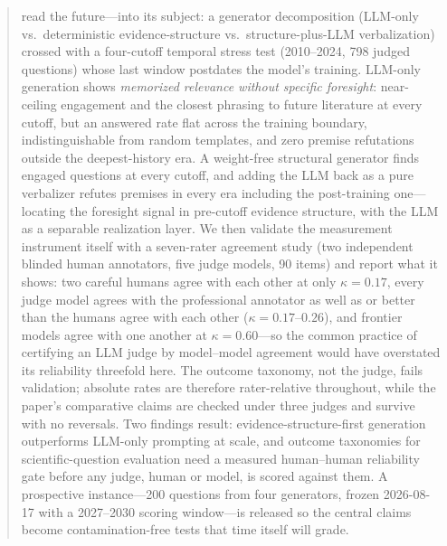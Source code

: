 \documentclass[11pt]{article}
\begin{document}
\begin{abstract}
read the future---into its subject: a generator decomposition (LLM-only
vs.\ deterministic evidence-structure vs.\ structure-plus-LLM
verbalization) crossed with a four-cutoff temporal stress test
(2010--2024, 798 judged questions) whose last window postdates the
model's training. LLM-only generation shows \emph{memorized relevance
without specific foresight}: near-ceiling engagement and the closest
phrasing to future literature at every cutoff, but an answered rate
flat across the training boundary, indistinguishable from random
templates, and zero premise refutations outside the deepest-history
era. A weight-free structural generator finds engaged questions at
every cutoff, and adding the LLM back as a pure verbalizer refutes
premises in every era including the post-training one---locating the
foresight signal in pre-cutoff evidence structure, with the LLM as a
separable realization layer. We then validate the measurement
instrument itself with a seven-rater agreement study (two independent
blinded human annotators, five judge models, 90 items) and report what
it shows: two careful humans agree with each other at only
$\kappa=0.17$, every judge model agrees with the professional annotator
as well as or better than the humans agree with each other
($\kappa=0.17$--$0.26$), and frontier models agree with one another at
$\kappa=0.60$---so the common practice of certifying an LLM judge by
model--model agreement would have overstated its reliability threefold
here. The outcome taxonomy, not the judge, fails validation; absolute
rates are therefore rater-relative throughout, while the paper's
comparative claims are checked under three judges and survive with no
reversals. Two findings result: evidence-structure-first generation
outperforms LLM-only prompting at scale, and outcome taxonomies for
scientific-question evaluation need a measured human--human reliability
gate before any judge, human or model, is scored against them. A
prospective instance---200 questions from four generators, frozen
2026-08-17 with a 2027--2030 scoring window---is released so the
central claims become contamination-free tests that time itself will
grade.
\end{abstract}


















\end{document}

